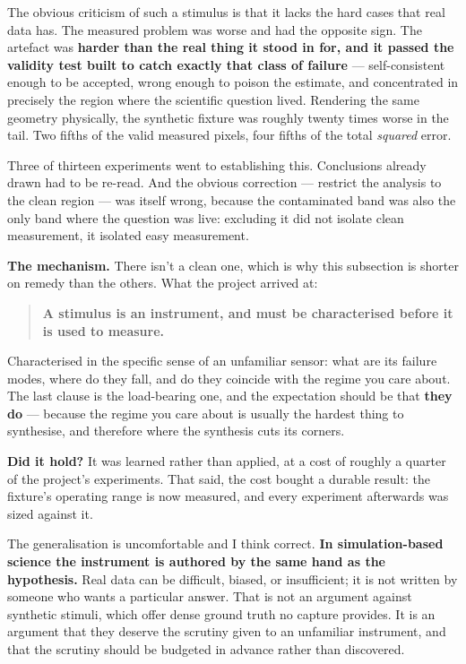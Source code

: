 The obvious criticism of such a stimulus is that it lacks the hard cases that real data has. The measured problem was worse and had the opposite sign. The artefact was \textbf{harder than the real thing it stood in for, and it passed the validity test built to catch exactly that class of failure} --- self-consistent enough to be accepted, wrong enough to poison the estimate, and concentrated in precisely the region where the scientific question lived. Rendering the same geometry physically, the synthetic fixture was roughly twenty times worse in the tail. Two fifths of the valid measured pixels, four fifths of the total \textit{squared} error.

Three of thirteen experiments went to establishing this. Conclusions already drawn had to be re-read. And the obvious correction --- restrict the analysis to the clean region --- was itself wrong, because the contaminated band was also the only band where the question was live: excluding it did not isolate clean measurement, it isolated easy measurement.

\textbf{The mechanism.} There isn't a clean one, which is why this subsection is shorter on remedy than the others. What the project arrived at:

\begin{quote}
\textbf{A stimulus is an instrument, and must be characterised before it is used to measure.}
\end{quote}

Characterised in the specific sense of an unfamiliar sensor: what are its failure modes, where do they fall, and do they coincide with the regime you care about. The last clause is the load-bearing one, and the expectation should be that \textbf{they do} --- because the regime you care about is usually the hardest thing to synthesise, and therefore where the synthesis cuts its corners.

\textbf{Did it hold?} It was learned rather than applied, at a cost of roughly a quarter of the project's experiments. That said, the cost bought a durable result: the fixture's operating range is now measured, and every experiment afterwards was sized against it.

The generalisation is uncomfortable and I think correct. \textbf{In simulation-based science the instrument is authored by the same hand as the hypothesis.} Real data can be difficult, biased, or insufficient; it is not written by someone who wants a particular answer. That is not an argument against synthetic stimuli, which offer dense ground truth no capture provides. It is an argument that they deserve the scrutiny given to an unfamiliar instrument, and that the scrutiny should be budgeted in advance rather than discovered.


